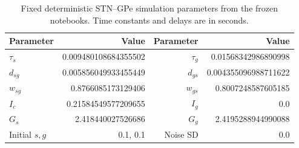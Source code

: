 \begin{table}[htbp]\centering
\caption{Fixed deterministic STN--GPe simulation parameters from the frozen notebooks. Time constants and delays are in seconds.}\label{tab:params}
\small
\setlength{\tabcolsep}{4pt}
\begin{tabular}{lrrr}\toprule
Parameter & Value & Parameter & Value \\ \midrule
$\tau_s$ & 0.009480108684355502 & $\tau_g$ & 0.01568342986890998 \\
$d_{sg}$ & 0.005856049933455449 & $d_{gs}$ & 0.004355096988711622 \\
$w_{sg}$ & 0.8766085173129406 & $w_{gs}$ & 0.8007248587605185 \\
$I_c$ & 0.21584549577209655 & $I_g$ & 0.0 \\
$G_s$ & 2.418440027526686 & $G_g$ & 2.4195288944990088 \\
Initial $s,g$ & 0.1, 0.1 & Noise SD & 0.0 \\
\bottomrule\end{tabular}
\end{table}
